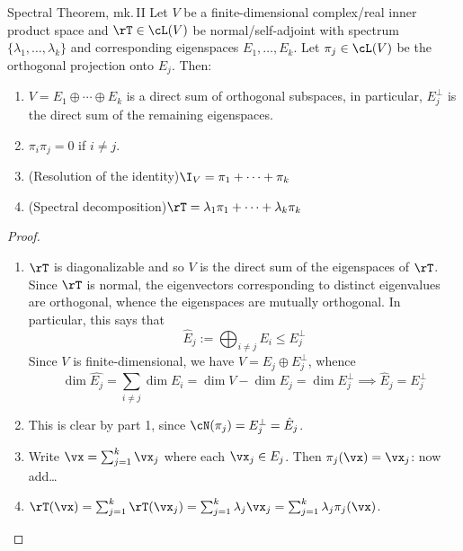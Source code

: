 \begin{thm}{Spectral Theorem, mk.\,II}{}
Let $V$ be a finite-dimensional complex/real inner product space and $\rT\in\cL(V)$ be normal/self-adjoint with spectrum $\{\lambda_1,\ldots,\lambda_k\}$ and corresponding eigenspaces $E_1,\ldots,E_k$. Let $\pi_j\in\cL(V)$ be the orthogonal projection onto $E_j$. Then:
\begin{enumerate}
  \item $V=E_1\oplus \cdots\oplus E_k$ is a direct sum of orthogonal subspaces, in particular, $E_j^\perp$ is the direct sum of the remaining eigenspaces.
  \item $\pi_i\pi_j=0$ if $i\neq j$.
  \item (Resolution of the identity)\quad $\I_V=\pi_1+\cdots+\pi_k$
  \item (Spectral decomposition)\quad $\rT=\lambda_1\pi_1+\cdots+\lambda_k\pi_k$
\end{enumerate}
\end{thm}

\begin{proof}
\begin{enumerate}
  \item $\rT$ is diagonalizable and so $V$ is the direct sum of the eigenspaces of $\rT$. Since $\rT$ is normal, the eigenvectors corresponding to distinct eigenvalues are orthogonal, whence the eigenspaces are mutually orthogonal. In particular, this says that
  \[\hat E_j:=\bigoplus_{i\neq j}E_i\le E_j^\perp\]
  Since $V$ is finite-dimensional, we have $V=E_j\oplus E_j^\perp$, whence
  \[\dim \hat{E_j}=\sum\limits_{i\neq j}\dim E_i=\dim V-\dim E_j=\dim E_j^\perp \implies \hat E_j=E_j^\perp\]
  \item This is clear by part 1, since $\cN(\pi_j)=E_j^\perp=\hat E_j$.
  \item Write $\vx=\sum_{j=1}^k\vx_j$ where each $\vx_j\in E_j$. Then $\pi_j(\vx)=\vx_j$: now add\ldots
  \item $\rT(\vx)=\sum_{j=1}^k\rT(\vx_j)=\sum_{j=1}^k\lambda_j\vx_j=\sum_{j=1}^k\lambda_j\pi_j(\vx)$.\qedhere
\end{enumerate}
\end{proof}

\goodbreak


